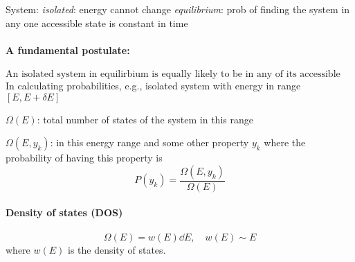 \documentclass[../main.tex]{subfiles}
\begin{document}
System: \emph{isolated}: energy cannot change
\emph{equilibrium}: prob of finding the system in any one accessible state is constant in time

\paragraph*{A fundamental postulate:}
\[\boxed{\textrm{An isolated system in equilirbium is equally likely to be in any of its accessible states}}\]
In calculating probabilities, e.g., isolated system with energy in range $[E, E+\delta E]$

$\Omega(E)$: total number of states of the system in this range

$\Omega(E,y_k)$: in this energy range and some other property $y_k$
where the probability of having this property is
\[P(y_k) = \frac{\Omega(E,y_k)}{\Omega(E)}\]

\paragraph*{Density of states (DOS)}
\[\Omega(E) = w(E) \dd E, \quad w(E) \sim E\]
where $w(E)$ is the density of states.
\end{document}
